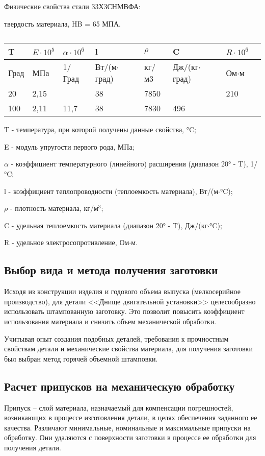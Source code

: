 Физические свойства стали 33Х3СНМВФА:

твердость материала, HB  = 65 МПА.

\begin{table}[h]
	\begin{center}
		\caption{}
		\begin{tabular}{|l|l|l|l|l|l|l|l|}
		\hline
T &  $E \cdot 10^5 $ & $\alpha \cdot 10^6 $ & l  &   $\rho$ & C & $R \cdot 10^6 $   \\ \hline
Град & МПа & 1/Град & Вт/(м$\cdot$град) & кг/м3 & Дж/(кг$\cdot$град) & Ом$\cdot$м \\ \hline
20 & 2,15 &  & 38 & 7850 &  & 210 \\ \hline
100 & 2,11 & 11,7 & 38 & 7830 & 496 & \\ \hline
		\end{tabular}
		\label{tab:techno_steel}
	\end{center}
\end{table}

T - температура, при которой получены данные свойства, °C;

E - модуль упругости первого рода, МПа;

$\alpha$ - коэффициент температурного (линейного) расширения (диапазон 20° - T), 1/°C;

l - коэффициент теплопроводности (теплоемкость материала), Вт/(м$\cdot$°C);

$\rho$ - плотность материала, кг/$\text{м}^3$;

C - удельная теплоемкость материала (диапазон 20° - T), Дж/(кг$\cdot$°C);

R - удельное электросопротивление, Ом$\cdot$м.

\subsection{Выбор вида и метода получения заготовки}
Исходя из конструкции изделия и годового объема выпуска (мелкосерийное производство), для детали <<Днище двигательной установки>> целесообразно использовать штампованную заготовку. Это позволит повысить коэффициент использования материала и снизить объем механической обработки.

Учитывая опыт создания подобных деталей, требования к прочностным свойствам детали и механические свойства материала, для получения заготовки был выбран метод горячей объемной штамповки.

\subsection{Расчет припусков на механическую обработку}
Припуск – слой материала, назначаемый для компенсации погрешностей, возникающих в процессе изготовления детали, в целях обеспечения заданного ее качества. Различают минимальные, номинальные и максимальные припуски на обработку. Они удаляются с поверхности заготовки в процессе ее обработки для получения детали.

